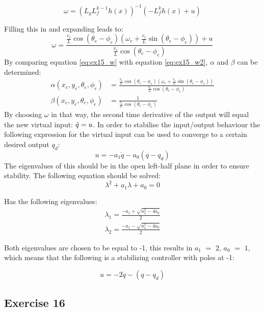 \begin{equation}
    \omega = (L_g L_f^{k-1} h(x))^{-1} (-L_f^k h(x) + u)
    \label{eq:ex15_w1}
\end{equation}

Filling this in and expanding leads to:
\begin{equation}
    \omega = \frac{\frac{v_r}{L}\cos(\theta_e - \phi_e)(\omega_r + \frac{v_r}{L}\sin(\theta_e - \phi_e)) + u}{\frac{v_r}{L} \cos(\theta_e - \phi_e)}
    \label{eq:ex15_w2}
\end{equation}
By comparing equation \eqref{eq:ex15_w} with equation \eqref{eq:ex15_w2}, $\alpha$ and $\beta$ can be determined:
\begin{align}
    \alpha(x_e, y_e, \theta_e, \phi_e) &= \frac{\frac{v_r}{L}\cos(\theta_e - \phi_e)(\omega_r + \frac{v_r}{L}\sin(\theta_e - \phi_e))}{\frac{v_r}{L} \cos(\theta_e - \phi_e)} \label{eq:ex15_alpha} \\
    \beta(x_e, y_e, \theta_e, \phi_e) &= \frac{1}{\frac{v_r}{L} \cos(\theta_e - \phi_e)}
\end{align}
By choosing $\omega$ in that way, the second time derivative of the output will equal the new virtual input: $\Ddot{q} = u$. In order to stabilise the input/output behaviour the following expression for the virtual input can be used to converge to a certain desired output $q_d$:
\begin{equation}
    u = -a_1 \dot{q} - a_0 (q - q_d)
    \label{eq:ex15_u}
\end{equation}
The eigenvalues of this should be in the open left-half plane in order to ensure stability. The following equation should be solved:
\begin{equation}
    \lambda^2 + a_1 \lambda + a_0 = 0
    \label{eq:ex15_eigvaleq}
\end{equation}

Has the following eigenvalues:
\begin{align}
    \lambda_1 = \frac{-a_1 + \sqrt{a_1^2 - 4a_0}}{2} \label{eq:ex15_lam1} \\
    \lambda_2 = \frac{-a_1 - \sqrt{a_1^2 - 4a_0}}{2} \label{eq:ex15_lam2} 
\end{align}

Both eigenvalues are chosen to be equal to -1, this results in $a_1$ $=$ $2$, $a_0$ $=$ $1$, which means that the following is a stabilizing controller with poles at -1:

\begin{equation}
    u = -2 \dot{q} - (q - q_d)
    \label{eq:ex15_contr}
\end{equation}

\subsection{Exercise 16}





